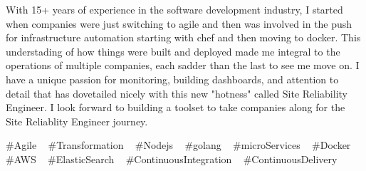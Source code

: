 

\begin{cvparagraph}


With 15+ years of experience in the software development industry, I started when companies were just switching to agile and then
was involved in the push for infrastructure automation starting with chef and then moving to docker.  This understading of how
things were built and deployed made me integral to the operations of multiple companies, each sadder than the last to see me move on.
  I have a unique passion for monitoring, building dashboards, and attention to detail that has dovetailed nicely with this new
"hotness" called Site Reliability Engineer.  I look forward to building a toolset to take companies along for the Site Reliablity
Engineer journey.


\end{cvparagraph}
\begin{cvtechnologies}
 \#Agile ~
 \#Transformation ~
 \#Nodejs ~
 \#golang ~
 \#microServices ~
 \#Docker ~
 \#AWS ~
 \#ElasticSearch ~
 \#ContinuousIntegration ~
 \#ContinuousDelivery ~
\end{cvtechnologies}

